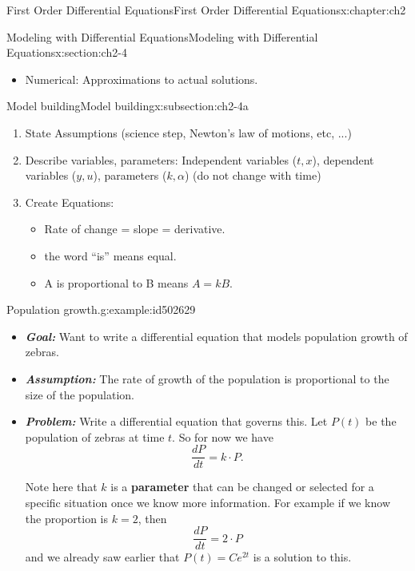 \documentclass[oneside,10pt,]{book}
\newcommand{\alert}[1]{\textbf{\textit{#1}}}
\newcommand{\terminology}[1]{\textbf{#1}}
\numberwithin{equation}{section}
\numberwithin{equation}{section}
\begin{document}
\begin{chapterptx}{First Order Differential Equations}{}{First Order Differential Equations}{}{}{x:chapter:ch2}
\begin{sectionptx}{Modeling with Differential Equations}{}{Modeling with Differential Equations}{}{}{x:section:ch2-4}
\begin{introduction}{}
\begin{itemize}[label=\textbullet]
\item{}Numerical: Approximations to actual solutions.%
\end{itemize}
\end{introduction}%
%
%
\typeout{************************************************}
\typeout{************************************************}
%
\begin{subsectionptx}{Model building}{}{Model building}{}{}{x:subsection:ch2-4a}
%
\begin{enumerate}
\item{}State Assumptions (science step, Newton's law of motions, etc, ...)%
\item{}Describe variables, parameters: Independent variables (\(t,x\)), dependent variables (\(y,u\)), parameters (\(k,\alpha\)) (do not change with time)%
\item{}Create Equations:%
\begin{itemize}[label=\textbullet]
\item{}Rate of change = slope = derivative.%
\item{}the word ``is'' means equal.%
\item{}A is proportional to B means \(A=kB\).%
\end{itemize}
%
\end{enumerate}
\begin{example}{Population growth.}{g:example:id502629}%
%
\begin{itemize}[label=\textbullet]
\item{}\alert{Goal:} Want to write a differential equation that models population growth of zebras.%
\item{}\alert{Assumption:} The rate of growth of the population is proportional to the size of the population.%
\item{}\alert{Problem:} Write a differential equation that governs this. Let \(P(t)\) be the population of zebras at time \(t\). So for now we have%
\begin{equation*}
\frac{dP}{dt}=k\cdot P.
\end{equation*}
%
\par
Note here that \(k\) is a \terminology{parameter} that can be changed or selected for a specific situation once we know more information. For example if we know the proportion is \(k=2\), then%
\begin{equation*}
\frac{dP}{dt}=2\cdot P
\end{equation*}
and we already saw earlier that \(P(t)=Ce^{2t}\) is a solution to this.%

\end{itemize}
\end{example}
\end{subsectionptx}
\end{sectionptx}
\end{chapterptx}
\end{document}
